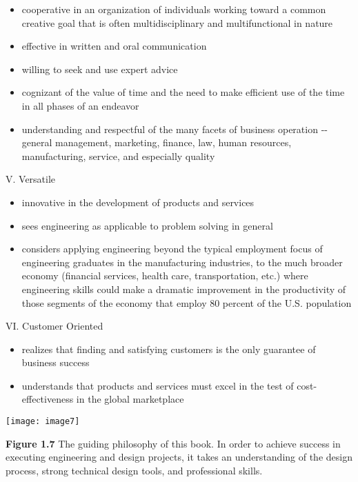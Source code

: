 \begin{itemize}
\item
  cooperative in an organization of individuals working toward a common
  creative goal that is often multidisciplinary and multifunctional in
  nature
\item
  effective in written and oral communication
\item
  willing to seek and use expert advice
\item
  cognizant of the value of time and the need to make efficient use of
  the time in all phases of an endeavor
\item
  understanding and respectful of the many facets of business operation
  -\/- general management, marketing, finance, law, human resources,
  manufacturing, service, and especially quality
\end{itemize}

V. Versatile

\begin{itemize}
\item
  innovative in the development of products and services
\item
  sees engineering as applicable to problem solving in general
\item
  considers applying engineering beyond the typical employment focus of
  engineering graduates in the manufacturing industries, to the much
  broader economy (financial services, health care, transportation,
  etc.) where engineering skills could make a dramatic improvement in
  the productivity of those segments of the economy that employ 80
  percent of the U.S. population
\end{itemize}

VI. Customer Oriented

\begin{itemize}
\item
  realizes that finding and satisfying customers is the only guarantee
  of business success
\item
  understands that products and services must excel in the test of
  cost-effectiveness in the global marketplace
\end{itemize}

\texttt{[image: image7]}

\textbf{Figure 1.7} The guiding philosophy of this book. In order to
achieve success in executing engineering and design projects, it takes
an understanding of the design process, strong technical design tools,
and professional skills.

